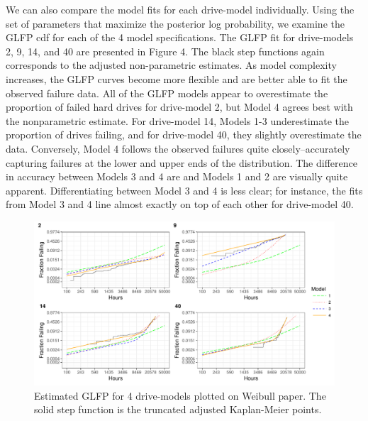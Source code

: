 \documentclass[12pt]{article}
\begin{document}
We can also compare the model fits for each drive-model individually.  Using the set of parameters that maximize the posterior log probability, we examine the GLFP cdf for each of the 4 model specifications.  The GLFP fit for drive-models 2, 9, 14, and 40 are presented in Figure 4.  The black step functions again corresponds to the adjusted non-parametric estimates.  As model complexity increases, the GLFP curves become more flexible and are better able to fit the observed failure data.  All of the GLFP models appear to overestimate the proportion of failed hard drives for drive-model 2, but Model 4 agrees best with the nonparametric estimate.  For drive-model 14, Models 1-3 underestimate the proportion of drives failing, and for drive-model 40, they slightly overestimate the data.  Conversely, Model 4 follows the observed failures quite closely--accurately capturing failures at the lower and upper ends of the distribution.  The difference in accuracy between Models 3 and 4 are and Models 1 and 2 are visually quite apparent.  Differentiating between Model 3 and 4 is less clear; for instance, the fits from Model 3 and 4 line almost exactly on top of each other for drive-model 40.
\begin{figure}[H]
    \centering
   \includegraphics[width=\textwidth]{fig/mod_compare_legend}
		\caption{Estimated GLFP for 4 drive-models plotted on Weibull paper.  The solid step function is the truncated adjusted Kaplan-Meier points.  \label{fig:first}} 
\end{figure}
\end{document}
